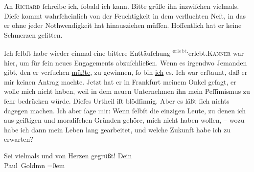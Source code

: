 \pstart
           {\pb}An \textsc{Richard} ſchreibe ich, ſobald ich kann. Bitte grüße ihn inzwiſchen vielmals. Dieſe
                  \label{K_L03195-6v}\label{K_L03195-6} kommt wahrſcheinlich von der Feuchtigkeit in dem verfluchten Neſt, in das er ohne jede\textcolor{gray}{r}
               Nothwendigkeit hat hinausziehen müſſen. Hoffentlich hat er keine Schmerzen
               gelitten.\pend
           
\pstart
           Ich ſelbſt habe wieder einmal eine bittere Enttäuſchung \substVorne{}\textsuperscript{e\textcolor{gray}{rlebt}.}\substDazwischen{}erlebt.\substHinten{}{ }\textsc{Kanner} war hier, um für ſein
               neues \label{K_L03195-7v}\label{K_L03195-7} Engagements  abzuſchließen. Wenn es
               irgendwo Jemanden gibt, den er verſuchen \uline{müßte}, zu
               gewinnen, ſo bin \uline{ich} es. Ich war erſtaunt, daß er mir
               keinen Antrag machte. Jetzt hat er in {\pb}Frankfurt meinem Onkel geſagt, er wolle mich nicht haben,
               weil in dem neuen Unternehmen
               ihn mein Peſſimismus zu ſehr bedrücken würde. 
               Dieſes Urtheil iſt blödſinnig. Aber es läßt ſich nichts dagegen machen. Ich aber ſage
                  \textcolor{gray}{mi}r: Wenn ſelbſt die einzigen Leute,  zu denen ich aus geiſtigen und moraliſchen Gründen gehöre,
               mich nicht haben wollen, – wozu habe ich dann mein Leben lang gearbeitet, und welche
               Zukunft habe ich zu erwarten?\pend
           
\pstart
           Sei vielmals und von Herzen gegrüßt! Dein {\\[\baselineskip]}\spacefill\mbox{Paul Goldmn}\pend
           \leftskip=0em{}\endnumbering{}  
      